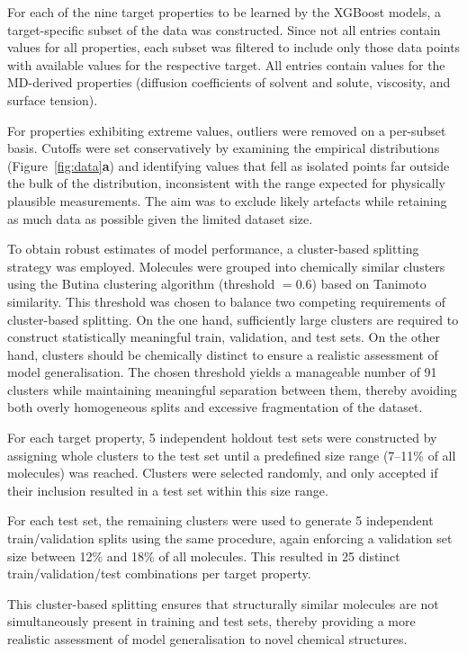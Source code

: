\documentclass[11pt]{aime}
\begin{document}
For each of the nine target properties to be learned by the XGBoost models, a target-specific subset of the data was constructed.  
Since not all entries contain values for all properties, each subset was filtered to include only those data points with available values for the respective target.  
All entries contain values for the MD-derived properties (diffusion coefficients of solvent and solute, viscosity, and surface tension).

For properties exhibiting extreme values, outliers were removed on a per-subset basis.
Cutoffs were set conservatively by examining the empirical distributions (Figure~\ref{fig:data}\textbf{a}) and identifying values that fell as isolated points far outside the bulk of the distribution, inconsistent with the range expected for physically plausible measurements.
The aim was to exclude likely artefacts while retaining as much data as possible given the limited dataset size.

To obtain robust estimates of model performance, a cluster-based splitting strategy was employed.  
Molecules were grouped into chemically similar clusters using the Butina clustering algorithm (threshold $= 0.6$) based on Tanimoto similarity. 
This threshold was chosen to balance two competing requirements of cluster-based splitting. 
On the one hand, sufficiently large clusters are required to construct statistically meaningful train, validation, and test sets. 
On the other hand, clusters should be chemically distinct to ensure a realistic assessment of model generalisation. 
The chosen threshold yields a manageable number of 91 clusters while maintaining meaningful separation between them, thereby avoiding both overly homogeneous splits and excessive fragmentation of the dataset.

For each target property, 5 independent holdout test sets were constructed by assigning whole clusters to the test set until a predefined size range (7--11\% of all molecules) was reached.  
Clusters were selected randomly, and only accepted if their inclusion resulted in a test set within this size range.

For each test set, the remaining clusters were used to generate 5 independent train/validation splits using the same procedure, again enforcing a validation set size between 12\% and 18\% of all molecules.  
This resulted in 25 distinct train/validation/test combinations per target property.

This cluster-based splitting ensures that structurally similar molecules are not simultaneously present in training and test sets, thereby providing a more realistic assessment of model generalisation to novel chemical structures.
\end{document}
